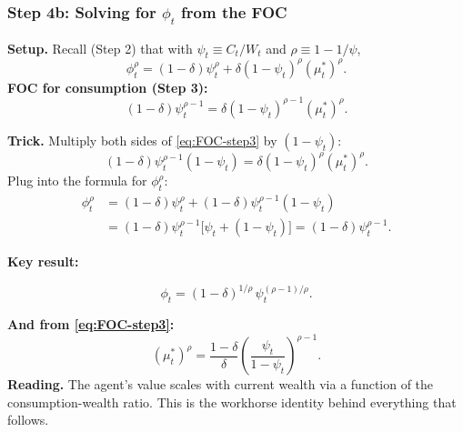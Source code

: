 \documentclass{beamer}
\begin{document}
\begin{frame}[allowframebreaks]
    \frametitle{Step 4b: Solving for $\phi_t$ from the FOC}

    \textbf{Setup.} Recall (Step 2) that with $\psi_t \equiv C_t/W_t$ and $\rho \equiv 1-1/\psi$,
    \begin{equation*}
    	\phi_t^\rho = (1-\delta)\psi_t^\rho + \delta(1-\psi_t)^\rho (\mu_t^*)^\rho.
    \end{equation*}
    \textbf{FOC for consumption (Step 3):}
    \begin{equation}\label{eq:FOC-step3}
    	(1-\delta)\psi_t^{\rho-1} = \delta(1-\psi_t)^{\rho-1}(\mu_t^*)^\rho.
    \end{equation}

    \framebreak

    \textbf{Trick.} Multiply both sides of \eqref{eq:FOC-step3} by $(1-\psi_t)$:
    \begin{equation*}
    	(1-\delta)\psi_t^{\rho-1}(1-\psi_t) = \delta(1-\psi_t)^{\rho}(\mu_t^*)^\rho.
    \end{equation*}
    Plug into the formula for $\phi_t^\rho$:
    \begin{equation*}
    	\begin{aligned}
    		\phi_t^\rho &= (1-\delta)\psi_t^\rho + (1-\delta)\psi_t^{\rho-1}(1-\psi_t) \\
    		&= (1-\delta)\psi_t^{\rho-1}\bigl[\psi_t + (1-\psi_t)\bigr] = (1-\delta)\psi_t^{\rho-1}.
    	\end{aligned}
    \end{equation*}

    \framebreak

    \textbf{Key result:}
    \begin{tcolorbox}[colback=blue!5!white, colframe=blue!75!black, title=Closed Form for $\phi_t$]
    \begin{equation}\label{eq:phi-closed}
    	\phi_t = (1-\delta)^{1/\rho}\,\psi_t^{(\rho-1)/\rho}.
    \end{equation}
    \end{tcolorbox}
    \textbf{And from \eqref{eq:FOC-step3}:}
    \begin{equation}\label{eq:mustar-closed}
    	(\mu_t^*)^\rho = \frac{1-\delta}{\delta}\left(\frac{\psi_t}{1-\psi_t}\right)^{\rho-1}.
    \end{equation}
    \textbf{Reading.} The agent's value scales with current wealth via a function of the consumption-wealth ratio. This is the workhorse identity behind everything that follows.
\end{frame}
\end{document}
